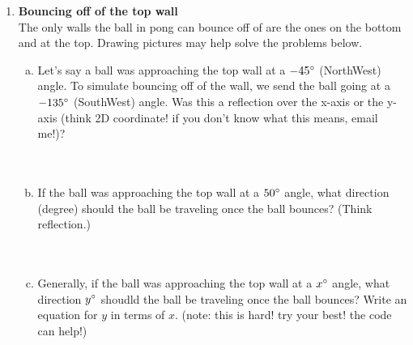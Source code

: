 \documentclass[11pt]{article}
\begin{document}
\begin{enumerate}
\item \textbf{Bouncing off of the top wall}\\
The only walls the ball in pong can bounce off of are the ones on the bottom and at the top. Drawing pictures may help solve the problems below.
\begin{enumerate}[a.]
\item Let's say a ball was approaching the top wall at a $-45\degree$ (NorthWest) angle. To simulate bouncing off of the wall, we send the ball going at a $-135\degree$ (SouthWest) angle. Was this a reflection over the x-axis or the y-axis (think 2D coordinate! if you don't know what this means, email me!)?\\\\\\
\item If the ball was approaching the top wall at a $50 \degree$ angle, what direction (degree) should the ball be traveling once the ball bounces? (Think reflection.)\\\\\\
\item Generally, if the ball was approaching the top wall at a $x \degree$ angle, what direction $y \degree$ shoudld the ball be traveling once the ball bounces? Write an equation for $y$ in terms of $x$. (note: this is hard! try your best! the code can help!)\\\\\\\\\\\\
\end{enumerate}
\end{enumerate}
\noindent\makebox[\linewidth]{\rule{\paperwidth}{0.4pt}}
\end{document}
